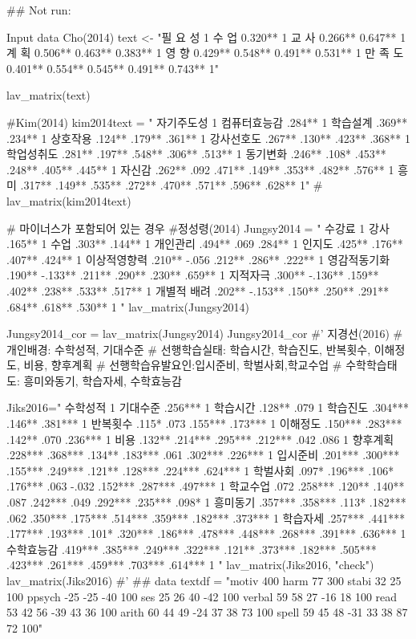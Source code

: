 \documentclass[a4paper]{book}
\begin{document}
\begin{Examples}
\begin{ExampleCode}
\#\# Not run: 

Input data Cho(2014)
text <- "필 요 성 1
         수 업 0.320** 1
         교 사 0.266** 0.647** 1
         계 획 0.506** 0.463** 0.383** 1
         영 향 0.429** 0.548** 0.491** 0.531** 1
         만 족 도 0.401** 0.554** 0.545** 0.491** 0.743** 1"

lav_matrix(text)

#Kim(2014)
kim2014text = "
자기주도성  1
컴퓨터효능감 .284** 1
학습설계  .369** .234** 1
상호작용  .124** .179** .361** 1
강사선호도  .267** .130** .423** .368** 1
학업성취도  .281** .197** .548** .306** .513** 1
동기변화  .246** .108* .453** .248** .405** .445** 1
자신감  .262** .092 .471** .149** .353** .482** .576** 1
흥미  .317** .149** .535** .272** .470** .571** .596** .628** 1"
\#
lav_matrix(kim2014text)

# 마이너스가 포함되어 있는 경우
#정성령(2014)
Jungsy2014 = "
수강료 1
강사 .165** 1
수업 .303** .144** 1
개인관리 .494** .069 .284** 1
인지도 .425** .176** .407** .424** 1
이상적영향력 .210** -.056 .212** .286** .222** 1
영감적동기화 .190** -.133** .211** .290** .230** .659** 1
지적자극 .300** -.136** .159** .402** .238** .533** .517** 1
개별적 배려 .202** -.153** .150** .250** .291** .684** .618** .530** 1
"
lav_matrix(Jungsy2014)

Jungsy2014_cor = lav_matrix(Jungsy2014)
Jungsy2014_cor
#'
지경선(2016)
# 개인배경: 수학성적, 기대수준
# 선행학습실태: 학습시간, 학습진도, 반복횟수, 이해정도, 비용, 향후계획
# 선행학습유발요인:입시준비, 학벌사회,학교수업
# 수학학습태도: 흥미와동기, 학습자세, 수학효능감


Jiks2016="
수학성적 1
기대수준 .256*** 1
학습시간 .128** .079 1
학습진도 .304*** .146** .381*** 1
반복횟수 .115* .073 .155*** .173*** 1
이해정도 .150*** .283*** .142** .070 .236*** 1
비용 .132** .214*** .295*** .212*** .042 .086 1
향후계획 .228*** .368*** .134** .183*** .061 .302*** .226*** 1
입시준비 .201*** .300*** .155*** .249*** .121** .128*** .224*** .624*** 1
학벌사회 .097* .196*** .106* .176*** .063 -.032 .152*** .287*** .497*** 1
학교수업 .072 .258*** .120** .140** .087 .242*** .049 .292*** .235*** .098* 1
흥미동기 .357*** .358*** .113* .182*** .062 .350*** .175*** .514*** .359*** .182*** .373*** 1
학습자세 .257*** .441*** .177*** .193*** .101* .320*** .186*** .478*** .448*** .268*** .391*** .636*** 1
수학효능감 .419*** .385*** .249*** .322*** .121** .373*** .182***
           .505*** .423*** .261*** .459*** .703*** .614*** 1
"
lav_matrix(Jiks2016, "check")
lav_matrix(Jiks2016)
#'
## data
textdf =  "motiv 400
harm      77  300
stabi     32   25   100
ppsych   -25  -25   -40    100
ses       25   26    40    -42 100
verbal    59   58    27    -16  18    100
read      53   42    56    -39  43     36  100
arith     60   44    49    -24  37     38   73   100
spell     59   45    48    -31  33     38   87    72   100"


\end{ExampleCode}
\end{Examples}
\end{document}
